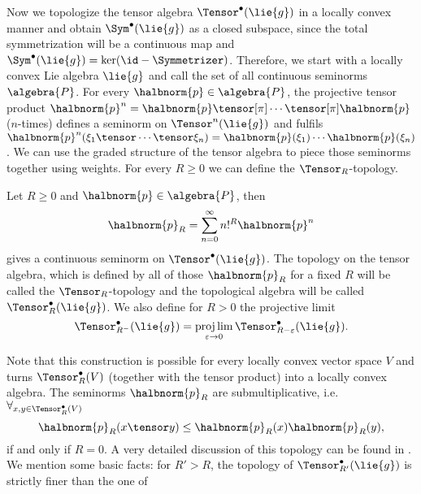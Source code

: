\documentclass[
11pt,                          %
english                        %
]{article}
\begin{document}
Now we topologize the tensor algebra $\Tensor^{\bullet}(\lie{g})$ in a locally convex 
manner and obtain $\Sym^{\bullet}(\lie{g})$ as a closed subspace, since the total 
symmetrization will be a continuous map and $\Sym^{\bullet}(\lie{g}) = \ker (\id - 
\Symmetrizer)$. Therefore, we start with a locally convex Lie algebra $\lie{g}$ and 
call the set of all continuous seminorms $\algebra{P}$. For every $\halbnorm{p} \in 
\algebra{P}$, the projective tensor product $\halbnorm{p}^n = \halbnorm{p} 
\tensor[\pi] \cdots \tensor[\pi] \halbnorm{p}$ ($n$-times) defines a seminorm on 
$\Tensor^n(\lie{g})$ and fulfils $\halbnorm{p}^n(\xi_1 \tensor \cdots \tensor \xi_n) 
= \halbnorm{p}(\xi_1) \cdots \halbnorm{p}(\xi_n)$. We can use the graded structure of 
the tensor algebra to piece those seminorms together using weights. For every 
$R \geq 0$ we can define the $\Tensor_R$-topology.
\begin{definition}
	\label{def:TR-topology}
	Let $R \geq 0$ and $\halbnorm{p} \in \algebra{P}$, then 
	\begin{equation}
		\label{def:TR-seminorms}
		\halbnorm{p}_R
		=
		\sum\limits_{n=0}^\infty
		n!^R \halbnorm{p}^n
	\end{equation}
	gives a continuous seminorm on $\Tensor^{\bullet}(\lie{g})$. 
	The topology on the tensor algebra, which is
	defined by all of those $\halbnorm{p}_R$ for a fixed $R$ will be called the 
	$\Tensor_R$-topology and the topological algebra will be called 
	$\Tensor_R^{\bullet}(\lie{g})$. We also define for $R > 0$ the projective limit
	\begin{equation}
		\label{def:TR-projective}
		\Tensor_{R^-}^{\bullet}(\lie{g})
		=
		\projlim\limits_{\varepsilon \rightarrow 0}
		\Tensor_{R - \varepsilon}^{\bullet}(\lie{g}).
	\end{equation}
\end{definition}
Note that this construction is possible for every locally convex vector space $V$ 
and turns $\Tensor_R^{\bullet}(V)$ (together with the tensor product) into a locally 
convex algebra. The seminorms $\halbnorm{p}_R$ are submultiplicative, i.e. 
$\forall_{x, y \in \Tensor_R^{\bullet}(V)}$
\begin{equation}
	\label{eq:TR-submultiplicative}
	\halbnorm{p}_R(x \tensor y)
	\leq
	\halbnorm{p}_R(x)
	\halbnorm{p}_R(y),
\end{equation}
if and only if $R = 0$. A very detailed discussion of this topology can be found in 
\cite{waldmann:2014a}. We mention some basic facts: for $R' > R$, the 
topology of $\Tensor_{R'}^{\bullet}(\lie{g})$ is strictly finer than the one of 
\end{document}
